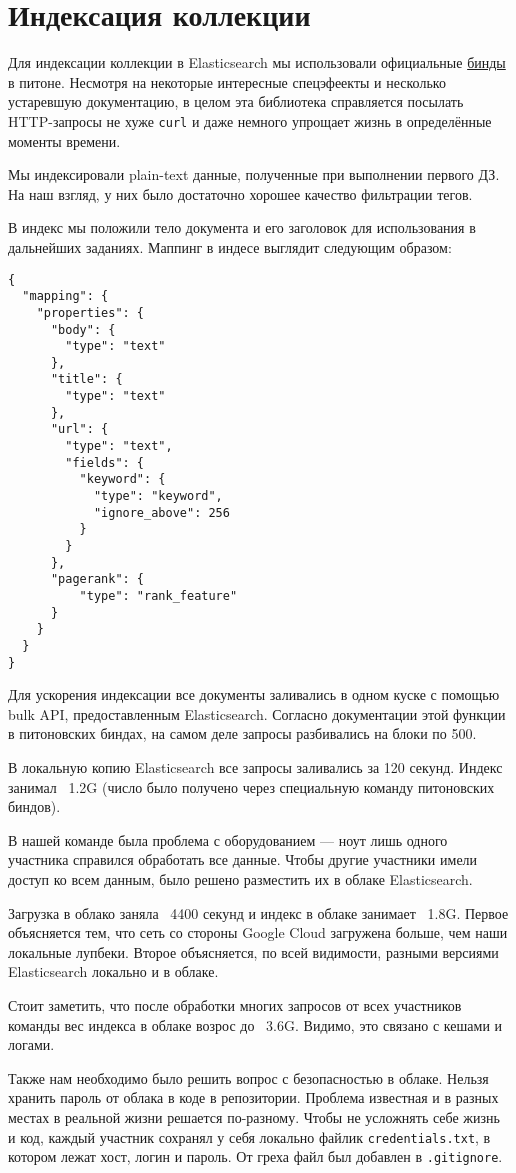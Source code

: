 \section{Индексация коллекции}

Для индексации коллекции в Elasticsearch мы использовали официальные \href{https://elasticsearch-py.readthedocs.io/en/master/api.html}{бинды} в питоне. Несмотря на некоторые интересные спецэфеекты и несколько устаревшую документацию, в целом эта библиотека справляется посылать HTTP-запросы не хуже \texttt{curl} и даже немного упрощает жизнь в определённые моменты времени.

Мы индексировали plain-text данные, полученные при выполнении первого ДЗ. На наш взгляд, у них было достаточно хорошее качество фильтрации тегов.

В индекс мы положили тело документа и его заголовок для использования в дальнейших заданиях. Маппинг в индесе выглядит следующим образом:

\begin{verbatim}
{
  "mapping": {
    "properties": {
      "body": {
        "type": "text"
      },
      "title": {
        "type": "text"
      },
      "url": {
        "type": "text",
        "fields": {
          "keyword": {
            "type": "keyword",
            "ignore_above": 256
          }
        }
      },
      "pagerank": {
	      "type": "rank_feature"
      }
    }
  }
}
\end{verbatim}

Для ускорения индексации все документы заливались в одном куске с помощью bulk API, предоставленным Elasticsearch. Согласно документации этой функции в питоновских биндах, на самом деле запросы разбивались на блоки по 500.

В локальную копию Elasticsearch все запросы заливались за 120 секунд. Индекс занимал ~1.2G (число было получено через специальную команду питоновских биндов).

В нашей команде была проблема с оборудованием — ноут лишь одного участника справился обработать все данные. Чтобы другие участники имели доступ ко всем данным, было решено разместить их в облаке Elasticsearch.

Загрузка в облако заняла ~4400 секунд и индекс в облаке занимает ~1.8G.
Первое объясняется тем, что сеть со стороны Google Cloud загружена больше, чем наши локальные лупбеки. Второе объясняется, по всей видимости, разными версиями Elasticsearch локально и в облаке.

Стоит заметить, что после обработки многих запросов от всех участников команды вес индекса в облаке возрос до ~3.6G. Видимо, это связано с кешами и логами.

Также нам необходимо было решить вопрос с безопасностью в облаке. Нельзя хранить пароль от облака в коде в репозитории. Проблема известная и в разных местах в реальной жизни решается по-разному. Чтобы не усложнять себе жизнь и код, каждый участник сохранял у себя локально файлик \texttt{credentials.txt}, в котором лежат хост, логин и пароль. От греха файл был добавлен в \texttt{.gitignore}.
